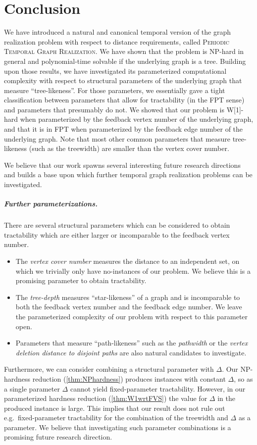 \documentclass[a4paper,UKenglish,cleveref, autoref, thm-restate, anonymous]{lipics-v2021}
\newcommand{\deltaExactLong}{\textsc{Periodic Temporal Graph Realization}}
\begin{document}



\section{Conclusion}\label{sec:conclusion}
We have introduced a natural and canonical temporal version of the graph realization problem with respect to distance requirements, called \deltaExactLong. 
We have shown that the problem is NP-hard in general and polynomial-time solvable if the underlying graph is a tree.
Building upon those results, we have investigated its parameterized computational complexity with respect to structural parameters of the underlying graph that measure ``tree-likeness''. For those parameters, we essentially gave a tight classification between parameters that allow for tractability (in the FPT sense) and parameters that presumably do not.
We showed that our problem is W[1]-hard when parameterized by the feedback vertex number of the underlying graph, and that it is in FPT when parameterized by the feedback edge number of the underlying graph. Note that most other common parameters that measure tree-likeness (such as the treewidth) are smaller than the vertex cover number.

We believe that our work spawns several interesting future research directions and builds a base upon which further temporal graph realization problems can be investigated.

\subparagraph{Further parameterizations.} There are several structural parameters which can be considered to obtain tractability which are either larger or incomparable to the feedback vertex number.
\begin{itemize}
    \item The \emph{vertex cover number} measures the distance to an independent set, on which we trivially only have no-instances of our problem. We believe this is a promising parameter to obtain tractability.
    \item The \emph{tree-depth} measures ``star-likeness'' of a graph and is incomparable to both the feedback vertex number and the feedback edge number. We leave the parameterized complexity of our problem with respect to this parameter open.
    \item Parameters that measure ``path-likeness'' such as the \emph{pathwidth} or the \emph{vertex deletion distance to disjoint paths} are also natural candidates to investigate.
\end{itemize}
Furthermore, we can consider combining a structural parameter with $\Delta$. Our NP-hardness reduction (\cref{thm:NPhardness}) produces instances with constant $\Delta$, so as a single parameter $\Delta$ cannot yield fixed-parameter tractability. However, in our parameterized hardness reduction (\cref{thm:W1wrtFVS}) the value for $\Delta$ in the produced instance is large. This implies that our result does not rule out e.g.\ fixed-parameter tractability for the combination of the treewidth and $\Delta$ as a parameter. We believe that investigating such parameter combinations is a promising future research direction.
\end{document}
